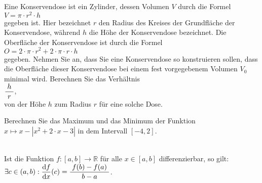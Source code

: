 \exercise
Eine Konservendose ist ein Zylinder, dessen Volumen $V$ durch die Formel
\\[0.2cm]
\hspace*{1.3cm}
$V = \pi \cdot r^2 \cdot h$
\\[0.2cm]
gegeben ist.  Hier bezeichnet $r$ den Radius des Kreises der Grundfl\"ache der Konservendose, w\"ahrend
$h$ die H\"ohe der Konservendose bezeichnet.  Die Oberfl\"ache der Konservendose ist durch die Formel
\\[0.2cm]
\hspace*{1.3cm}
$O = 2 \cdot \pi \cdot r^2 + 2 \cdot \pi \cdot r \cdot h$
\\[0.2cm]
gegeben.  Nehmen Sie an, dass Sie eine Konservendose so konstruieren sollen, dass die Oberfl\"ache
dieser Konservendose bei einem fest vorgegebenem Volumen $V_0$  minimal wird.  Berechnen Sie das
Verh\"altnis
\\[0.2cm]
\hspace*{1.3cm}
$\displaystyle\frac{\;h\;}{r}$,
\\[0.2cm]
von der H\"ohe $h$ zum Radius $r$ f\"ur eine solche Dose.  \eox

\exercise
Berechnen Sie das Maximum und das Minimum der Funktion $x \mapsto x - |x^2 + 2 \cdot x - 3|$ in dem Intervall $[-4,2]$.  \eox

\begin{Satz}
  \hspace*{\fill} \\
  Ist die Funktion $f:[a,b] \rightarrow \mathbb{R}$ f\"ur alle $x\in[a,b]$ differenzierbar, 
  so gilt: 
  \\[0.3cm]
  \hspace*{1.3cm}
  $\exists c \in (a,b): \displaystyle\frac{\textrm{d}f}{\textrm{d}x}(c) = \displaystyle\frac{\;\displaystyle f(b) - f(a)\;}{\;\displaystyle b - a\;}$.
\end{Satz}

